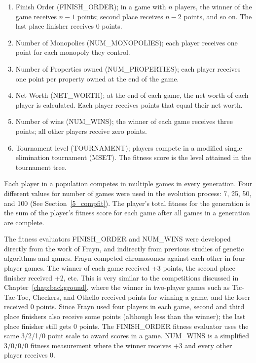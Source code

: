 \begin{enumerate}
  \item {Finish Order (FINISH\_ORDER); in a game with \(n\) players, the winner
  of the game receives \(n-1\) points; second place receives \(n-2\) points, and
  so on. The last place finisher receives 0 points.}
  \item {Number of Monopolies (NUM\_MONOPOLIES); each player receives one
  point for each mo\-no\-poly they control.}
  \item {Number of Properties owned (NUM\_PROPERTIES); each player receives one
  point per property owned at the end of the game.}
  \item {Net Worth (NET\_WORTH); at the end of each game, the net worth of each
  player is calculated. Each player receives points that equal their net
  worth.}
  \item {Number of wins (NUM\_WINS); the winner of each game receives three
  points; all other players receive zero points.}
  \item {Tournament level (TOURNAMENT); players compete in a modified single
  elimination tournament (MSET). The fitness score is the level attained in the
  tournament tree.}
\end{enumerate}

Each player in a population competes in multiple games in every generation. Four
different values for number of games were used in the evolution process: 7, 25,
50, and 100 (See Section~\ref{5_compfit}). The player's total fitness for the
generation is the sum of the player's fitness score for each game after all
games in a generation are complete.

The fitness evaluators FINISH\_ORDER and NUM\_WINS were developed directly from
the work of Frayn, and indirectly from previous studies of genetic algorithms
and games. Frayn competed chromosomes against each other in four-player games.
The winner of each game received +3 points, the second place finisher received
+2, etc. This is very similar to the competitions discussed in
Chapter~\ref{chap:background}, where the winner in two-player games such as
Tic-Tac-Toe, Checkers, and Othello received points for winning a game, and the
loser received 0 points. Since Frayn used four players in each game, second and
third place finishers also receive some points (although less than the winner);
the last place finisher still gets 0 points. The FINISH\_ORDER fitness evaluator
uses the same 3/2/1/0 point scale to award scores in a game. NUM\_WINS  is a
simplified 3/0/0/0 fitness measurement where the winner receives +3 and every 
other player receives 0.

